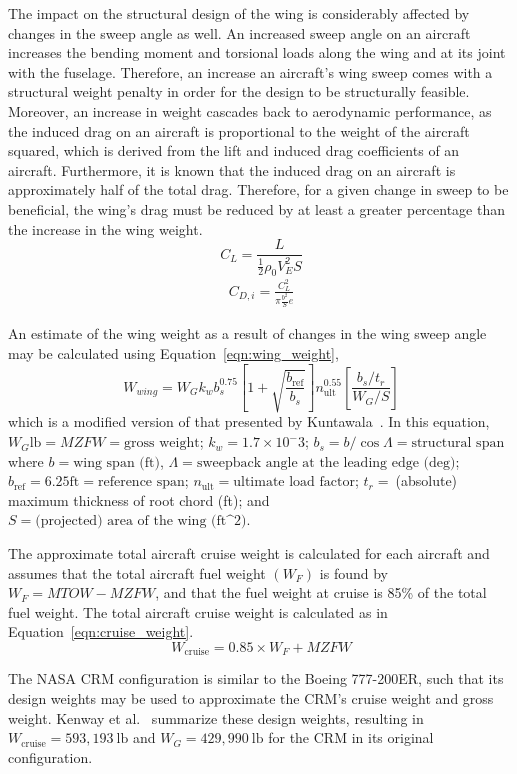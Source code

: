 The impact on the structural design of the wing is considerably affected by changes in the sweep angle as well. An increased sweep angle on an aircraft increases the bending moment and torsional loads along the wing and at its joint with the fuselage. Therefore, an increase an aircraft's wing sweep comes with a structural weight penalty in order for the design to be structurally feasible. Moreover, an increase in weight cascades back to aerodynamic performance, as the induced drag on an aircraft is proportional to the weight of the aircraft squared, which is derived from the lift and induced drag coefficients of an aircraft. Furthermore, it is known that the induced drag on an aircraft is approximately half of the total drag. Therefore, for a given change in sweep to be beneficial, the wing's drag must be reduced by at least a greater percentage than the increase in the wing weight.
\begin{equation}
~\label{eqn:lift_coef}
    C_L = \frac{L}{\frac{1}{2}\rho_0 V_{E}^2 S}
\end{equation}
\begin{equation}
~\label{eqn:induced_drag}
    \begin{split}
        C_{D,i} = \frac{C_{L}^2}{\pi\frac{b^2}{S}e}
    \end{split}
\end{equation}\par
An estimate of the wing weight as a result of changes in the wing sweep angle may be calculated using Equation~\ref{eqn:wing_weight},
\begin{equation}
~\label{eqn:wing_weight}
W_{wing}=W_G k_w b_{s}^{0.75} \left[1+\sqrt{\frac{b_{\text{ref}}}{b_s}}\right] n_{\text{ult}}^{0.55} \left[\frac{b_s/t_r}{W_G /S}\right]
\end{equation}
which is a modified version of that presented by Kuntawala~\cite{kuntawala_aerodynamic_2011}. In this equation, $W_G \text{lb} = MZFW = \text{gross weight}$; $k_w = 1.7\times10^-3$; $b_s=b/\cos{\Lambda}=\text{structural span}$ where $b = \text{wing span (ft)}$, $\Lambda = \text{sweepback angle at the leading edge (deg)}$; $b_{\text{ref}}=6.25\text{ft}=\text{reference span}$; $n_{\text{ult}}=\text{ultimate load factor}$; $t_r=\ $(absolute) maximum thickness of root chord (ft); and $S=\text{(projected) area of the wing (ft^2)}$.

The approximate total aircraft cruise weight is calculated for each aircraft and assumes that the total aircraft fuel weight $(W_F)$ is found by $W_F=MTOW-MZFW$, and that the fuel weight at cruise is 85\% of the total fuel weight. The total aircraft cruise weight is calculated as in Equation~\ref{eqn:cruise_weight}.
\begin{equation}
~\label{eqn:cruise_weight}
    W_{\text{cruise}}=0.85\times W_F+MZFW
\end{equation}\par
The NASA CRM configuration is similar to the Boeing 777-200ER, such that its design weights may be used to approximate the CRM's cruise weight and gross weight. Kenway et al.~\cite{kenway_aerostructural_2014} summarize these design weights, resulting in $W_{\text{cruise}}=593,193\ \text{lb}$ and $W_G=429,990\ \text{lb}$ for the CRM in its original configuration. 

